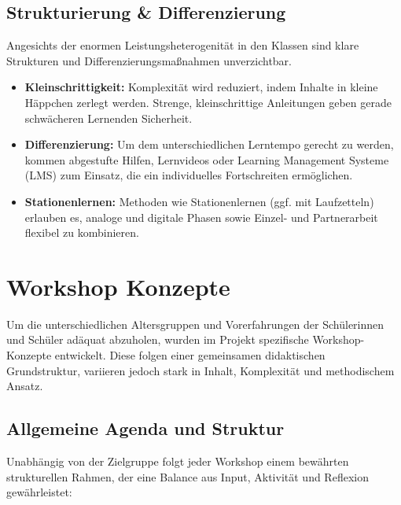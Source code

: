 \documentclass[a5paper,pagesize,10pt,bibtotoc,pointlessnumbers,
normalheadings,DIV=9,twoside=false]{scrbook}
\begin{document}
\subsection*{Strukturierung \& Differenzierung}

Angesichts der enormen Leistungsheterogenität in den Klassen sind klare Strukturen und Differenzierungsmaßnahmen unverzichtbar.

\begin{itemize}
    \item \textbf{Kleinschrittigkeit:} Komplexität wird reduziert, indem Inhalte in kleine Häppchen zerlegt werden. Strenge, kleinschrittige Anleitungen geben gerade schwächeren Lernenden Sicherheit.
    \item \textbf{Differenzierung:} Um dem unterschiedlichen Lerntempo gerecht zu werden, kommen abgestufte Hilfen, Lernvideos oder Learning Management Systeme (LMS) zum Einsatz, die ein individuelles Fortschreiten ermöglichen.
    \item \textbf{Stationenlernen:} Methoden wie Stationenlernen (ggf. mit Laufzetteln) erlauben es, analoge und digitale Phasen sowie Einzel- und Partnerarbeit flexibel zu kombinieren.
\end{itemize}

\section*{Workshop Konzepte}

Um die unterschiedlichen Altersgruppen und Vorerfahrungen der Schülerinnen und Schüler adäquat abzuholen, wurden im Projekt spezifische Workshop-Konzepte entwickelt. Diese folgen einer gemeinsamen didaktischen Grundstruktur, variieren jedoch stark in Inhalt, Komplexität und methodischem Ansatz.

\subsection*{Allgemeine Agenda und Struktur}

Unabhängig von der Zielgruppe folgt jeder Workshop einem bewährten strukturellen Rahmen, der eine Balance aus Input, Aktivität und Reflexion gewährleistet:
\end{document}
